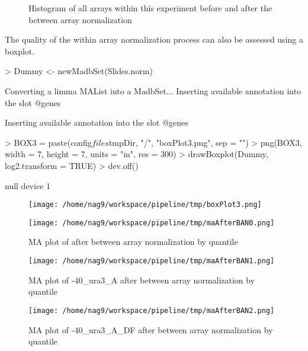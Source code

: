 \documentclass[titlepage]{article}
\begin{document}
\begin{figure}[htb!]
\centering
{}
\caption{Histogram of all arrays within this experiment before and after 
the between array normalization}
\end{figure}
\pagebreak
The quality of the within array normalization process can also be assessed 
using a boxplot.
\begin{Schunk}
\begin{Sinput}
> Dummy <- newMadbSet(Slides.norm)
\end{Sinput}
\begin{Soutput}
Converting a limma MAList into a MadbSet...
Inserting available annotation into the slot @genes

Inserting available annotation into the slot @genes
\end{Soutput}
\begin{Sinput}
> BOX3 = paste(config$files$tmpDir, "/", "boxPlot3.png", sep = "")
> png(BOX3, width = 7, height = 7, units = "in", res = 300)
> drawBoxplot(Dummy, log2.transform = TRUE)
> dev.off()
\end{Sinput}
\begin{Soutput}
null device 
          1 
\end{Soutput}
\end{Schunk}
\begin{figure}[htb!]
\centering
\texttt{[image: /home/nag9/workspace/pipeline/tmp/boxPlot3.png]}
\end{figure}
\pagebreak
\begin{figure}[htb!]
\centering
\texttt{[image: /home/nag9/workspace/pipeline/tmp/maAfterBAN0.png]}
\caption{MA plot of  after between array normalization by quantile}
\end{figure}\pagebreak
\begin{figure}[htb!]
\centering
\texttt{[image: /home/nag9/workspace/pipeline/tmp/maAfterBAN1.png]}
\caption{MA plot of -40\_ura3\_A after between array normalization by quantile}
\end{figure}\pagebreak
\begin{figure}[htb!]
\centering
\texttt{[image: /home/nag9/workspace/pipeline/tmp/maAfterBAN2.png]}
\caption{MA plot of -40\_ura3\_A\_DF after between array normalization by quantile}
\end{figure}\pagebreak
\end{document}
